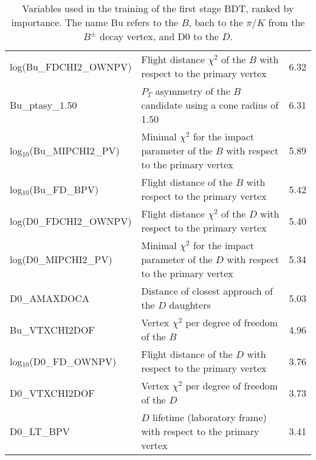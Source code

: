 \documentclass[oneside,12pt]{article}
\begin{document}
{\begin{landscape}
\begin{table}[]
{\begin{tabular}{lll}
log(Bu\_FDCHI2\_OWNPV)      & Flight distance $\chi^2$ of the $B$ with respect to 
the primary vertex
                            & 6.32
                            \\
Bu\_ptasy\_1.50             & $P_{T}$ asymmetry of the $B$ candidate using a cone 
radius of 1.50
                            & 6.31                              
                            \\
log$_{10}$(Bu\_MIPCHI2\_PV) & Minimal $\chi^2$ for the impact parameter of the $B$ 
with respect to the primary vertex
                            & 5.89
                            \\
log$_{10}$(Bu\_FD\_BPV)     & Flight  distance of the $B$ with respect to the 
primary vertex
                            & 5.42
                            \\
log(D0\_FDCHI2\_OWNPV)      & Flight distance $\chi^2$ of the $D$ with respect to
the primary vertex          & 5.40
                            \\
log(D0\_MIPCHI2\_PV)        & Minimal $\chi^2$ for the impact parameter of the $D$
with respect to the primary vertex
                            & 5.34
                            \\
D0\_AMAXDOCA                & Distance of closest approach of the $D$ daughters
                            & 5.03
                            \\
Bu\_VTXCHI2DOF              & Vertex $\chi^2$ per degree of freedom of the $B$
                            & 4.96
                            \\
log$_{10}$(D0\_FD\_OWNPV)   & Flight distance of the $D$ with respect to the
primary vertex              & 3.76
                            \\
D0\_VTXCHI2DOF              & Vertex $\chi^2$ per degree of freedom of the $D$
                            & 3.73
                            \\
D0\_LT\_BPV                 & $D$ lifetime (laboratory frame) with respect to 
the primary vertex          & 3.41
                            \\ \hline
\end{tabular}
} \caption{\small{Variables used in the training of the first stage BDT, ranked
by importance. The name Bu refers to the $B$, bach to the $\pi/K$ from the
$B^{\pm}$ decay vertex, and D0 to the $D$.}}
\label{table:bdt1TrainingVar}
\end{table}


\end{landscape}}
\end{document}
